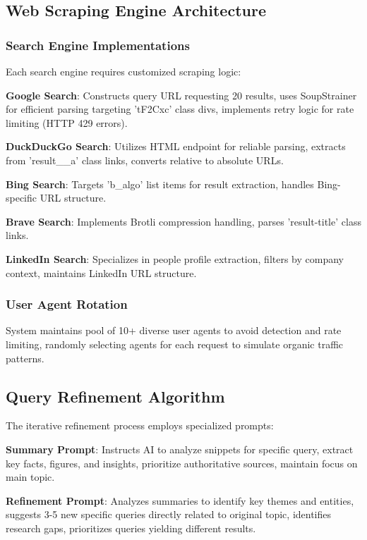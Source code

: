 \documentclass[conference]{IEEEtran}
\begin{document}
\subsection{Web Scraping Engine Architecture}

\subsubsection{Search Engine Implementations}
Each search engine requires customized scraping logic:

\textbf{Google Search}: Constructs query URL requesting 20 results, uses SoupStrainer for efficient parsing targeting 'tF2Cxc' class divs, implements retry logic for rate limiting (HTTP 429 errors).

\textbf{DuckDuckGo Search}: Utilizes HTML endpoint for reliable parsing, extracts from 'result\_\_a' class links, converts relative to absolute URLs.

\textbf{Bing Search}: Targets 'b\_algo' list items for result extraction, handles Bing-specific URL structure.

\textbf{Brave Search}: Implements Brotli compression handling, parses 'result-title' class links.

\textbf{LinkedIn Search}: Specializes in people profile extraction, filters by company context, maintains LinkedIn URL structure.

\subsubsection{User Agent Rotation}
System maintains pool of 10+ diverse user agents to avoid detection and rate limiting, randomly selecting agents for each request to simulate organic traffic patterns.

\subsection{Query Refinement Algorithm}

The iterative refinement process employs specialized prompts:

\textbf{Summary Prompt}: Instructs AI to analyze snippets for specific query, extract key facts, figures, and insights, prioritize authoritative sources, maintain focus on main topic.

\textbf{Refinement Prompt}: Analyzes summaries to identify key themes and entities, suggests 3-5 new specific queries directly related to original topic, identifies research gaps, prioritizes queries yielding different results.
\end{document}
